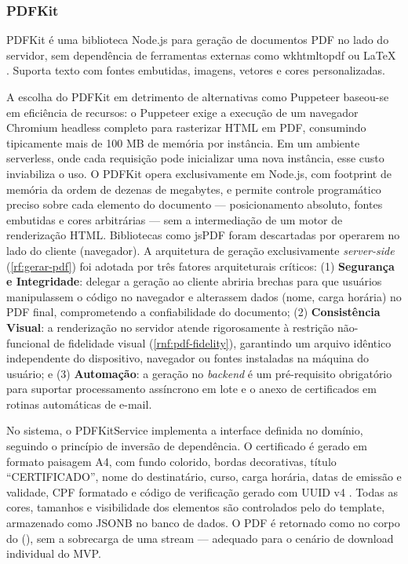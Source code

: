 \subsubsection{PDFKit}
PDFKit é uma biblioteca Node.js para geração de documentos PDF no lado do servidor, sem dependência de ferramentas externas como wkhtmltopdf \cite{wkhtmltopdf2025} ou LaTeX \cite{pdfkit2025}. Suporta texto com fontes embutidas, imagens, vetores e cores personalizadas.

A escolha do PDFKit em detrimento de alternativas como Puppeteer baseou-se em eficiência de recursos: o Puppeteer exige a execução de um navegador Chromium headless completo para rasterizar HTML em PDF, consumindo tipicamente mais de 100 MB de memória por instância. Em um ambiente serverless, onde cada requisição pode inicializar uma nova instância, esse custo inviabiliza o uso. O PDFKit opera exclusivamente em Node.js, com footprint de memória da ordem de dezenas de megabytes, e permite controle programático preciso sobre cada elemento do documento — posicionamento absoluto, fontes embutidas e cores arbitrárias — sem a intermediação de um motor de renderização HTML. Bibliotecas como jsPDF foram descartadas por operarem no lado do cliente (navegador). A arquitetura de geração exclusivamente \textit{server-side} (\ref{rf:gerar-pdf}) foi adotada por três fatores arquiteturais críticos: (1) \textbf{Segurança e Integridade}: delegar a geração ao cliente abriria brechas para que usuários manipulassem o código no navegador e alterassem dados (nome, carga horária) no PDF final, comprometendo a confiabilidade do documento; (2) \textbf{Consistência Visual}: a renderização no servidor atende rigorosamente à restrição não-funcional de fidelidade visual (\ref{rnf:pdf-fidelity}), garantindo um arquivo idêntico independente do dispositivo, navegador ou fontes instaladas na máquina do usuário; e (3) \textbf{Automação}: a geração no \textit{backend} é um pré-requisito obrigatório para suportar processamento assíncrono em lote e o anexo de certificados em rotinas automáticas de e-mail.

No sistema, o PDFKitService implementa a interface  definida no domínio, seguindo o princípio de inversão de dependência. O certificado é gerado em formato paisagem A4, com fundo colorido, bordas decorativas, título ``CERTIFICADO'', nome do destinatário, curso, carga horária, datas de emissão e validade, CPF formatado e código de verificação gerado com UUID v4 \cite{uuid2025}. Todas as cores, tamanhos e visibilidade dos elementos são controlados pelo  do template, armazenado como JSONB no banco de dados. O PDF é retornado como  no corpo do  (), sem a sobrecarga de uma stream --- adequado para o cenário de download individual do MVP.

